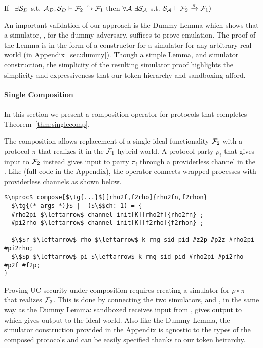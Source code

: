 \begin{theorem}\label{thm:dummythicclemma}
If \ $\exists \mathcal{S}_{D}$ s.t. $ \mathcal{A}_\mathcal{D}, \mathcal{S}_{D} \vdash \mathcal{F}_2 \xrightarrow{\pi} \mathcal{F}_1$ then $\forall \mathcal{A} \ \exists \mathcal{S}_\mathcal{A}$ s.t. $\mathcal{S}_{\mathcal{A}} \vdash  \mathcal{F}_2 \xrightarrow{\pi} \mathcal{F}_1)$ 
\end{theorem}
An important validation of our approach is the Dummy Lemma which shows that a simulator, \DS, for the dummy adversary, suffices to prove emulation. 
The proof of the Lemma is in the form of a constructor for a simulator for any arbitrary real world \A (in Appendix~\ref{sec:dummy}).
Though a simple Lemma, and simulator construction, the simplicity of the resulting simulator proof highlights the simplicity and expressiveness that our token hierarchy and sandboxing afford. 

\paragraph*{\textbf{Single Composition}}
In this section we present a composition operator for protocols that completes Theorem~\ref{thm:singlecomp}.

The composition allows replacement of a single ideal functionality $\mathcal{F}_2$ with a protocol $\pi$ that realizes it in the $\mathcal{F}_1$-hybrid world. 
A protocol party $\rho_i$ that gives input to $\mathcal{F}_2$ instead gives input to party $\pi_i$ through a providerless channel in the \partywrapper. 
Like  (full code in the Appendix), the operator connects wrapped processes with providerless channels as shown below. 
\begin{lstlisting}[basicstyle=\footnotesize\BeraMonottFamily, mathescape, frame=single]
$\nproc$ compose[$\tg{...}$][rho2f,f2rho]{rho2fn,f2rhon}
  $\tg{(* args *)}$ |- ($\$$ch: 1) = {
  #rho2pi $\leftarrow$ channel_init[K][rho2f]{rho2fn} ;
  #pi2rho $\leftarrow$ channel_init[K][f2rho]{f2rhon} ;
  
  $\$$r $\leftarrow$ rho $\leftarrow$ k rng sid pid #z2p #p2z #rho2pi #pi2rho; 
  $\$$p $\leftarrow$ pi $\leftarrow$ k rng sid pid #rho2pi #pi2rho #p2f #f2p;
}
\end{lstlisting}

Proving UC security under composition requires creating a simulator for $\rho \circ \pi$ that realizes $\mathcal{F}_3$. 
This is done by connecting the two simulators, \SIM{\pi} and \SIM{\rho}, in the same way as the Dummy Lemma: sandboxed \SIM{\pi} receives input from \Z, gives output to \SIM{\rho} which gives output to the ideal world.  
Also like the Dummy Lemma, the simulator construction provided in the Appendix is agnostic to the types of the composed protocols and can be easily specified thanks to our token heirarchy. 


